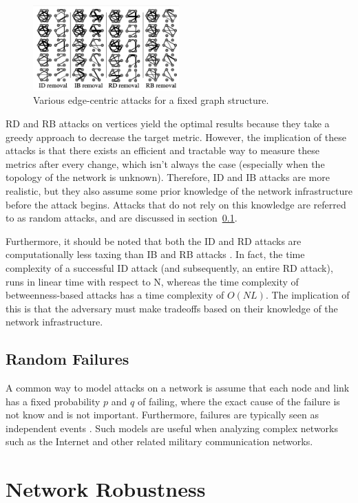 \documentclass[11pt]{article}
\begin{document}
\begin{figure}[h!]
	\label{fig:Onion}
	\centering
		\includegraphics[width=0.5\textwidth]{edge_attacks.png}
	\caption{Various edge-centric attacks for a fixed graph structure.}
\end{figure}

RD and RB attacks on vertices yield the optimal results because they take a greedy approach to decrease the target metric. However, the implication of these attacks is that there exists an efficient and tractable way to measure these metrics after every change, which isn't always the case (especially when the topology of the network is unknown). Therefore, ID and IB attacks are more realistic, but they also assume some prior knowledge of the network infrastructure before the attack begins. Attacks that do not rely on this knowledge are referred to as random attacks, and are discussed in section~\ref{RandomFailures}.

Furthermore, it should be noted that both the ID and RD attacks are computationally less taxing than IB and RB attacks \cite{Attacks}. In fact, the time complexity of a successful ID attack (and subsequently, an entire RD attack), runs in linear time with respect to N, whereas the time complexity of betweenness-based attacks has a time complexity of $O(NL)$. The implication of this is that the adversary must make tradeoffs based on their knowledge of the network infrastructure.

\subsection{Random Failures}
\label{RandomFailures}
A common way to model attacks on a network is assume that each node and link has a fixed probability $p$ and $q$ of failing, where the exact cause of the failure is not know and is not important. Furthermore, failures are typically seen as independent events \cite{RandomStudy}. Such models are useful when analyzing complex networks such as the Internet and other related military communication networks. 

\section{Network Robustness}
\end{document}
